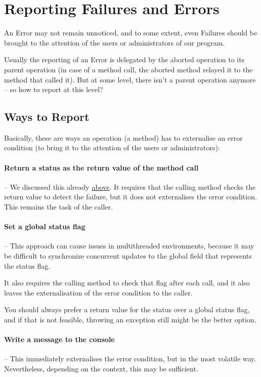 \section{Reporting Failures and Errors}\label{sec:ReportFailure}
An Error may not remain unnoticed, and to some extent, even Failures should be brought to the attention of the users or administrators of our program.

Usually the reporting of an Error is delegated by the aborted operation to its parent operation (in case of a method call, the aborted method relayed it to the method that called it). But at some level, there isn’t a parent operation anymore – so how to report at this level?

\subsection{Ways to Report}
Basically, these are ways an operation (a method) has to externalise an error condition (to bring it to the attention of the users or administrators):

\paragraph{Return a status as the return value of the method call}– We discussed this already \hyperref[sec:FailureVsError]{above}. It requires that the calling method checks the return value to detect the failure, but it does not externalises the error condition. This remains the task of the caller. 

\paragraph{Set a global status flag}– This approach can cause issues in multithreaded environments, because it may be difficult to synchronize concurrent updates to the global field that represents the status flag.

It also requires the calling method to check that flag after each call, and it also leaves the externalisation of the error condition to the caller.

You should always prefer a return value for the status over a global status flag, and if that is not feasible, throwing an exception still might be the better option.

\paragraph{Write a message to the console}– This immediately externalises the error condition, but in the most volatile way. Nevertheless, depending on the context, this may be sufficient.

